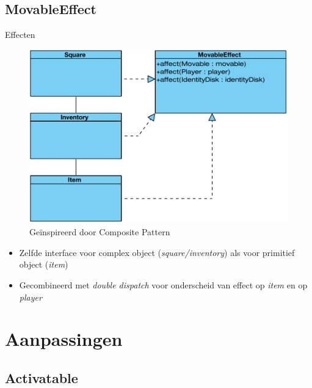 \documentclass[t]{beamer}
\begin{document}
\subsection{MovableEffect}
\begin{frame}{Effecten}
\begin{multicols}{2}
\begin{minipage}{\columnwidth}
\begin{figure}
	\center
	\includegraphics[width=\linewidth]{img/composite.pdf}
	\caption{Ge\"{i}nspireerd door Composite Pattern}
\end{figure}
\end{minipage}
\begin{minipage}{\columnwidth}
\begin{itemize}
	\item Zelfde interface voor complex object (\textit{square/inventory}) als voor primitief object (\textit{item}) 
	\item Gecombineerd met \textit{double dispatch} voor onderscheid van effect op \textit{item} en op \textit{player}
\end{itemize}
\end{minipage}


\end{multicols}
\end{frame}

\section{Aanpassingen}

\subsection{Activatable}
\end{document}
